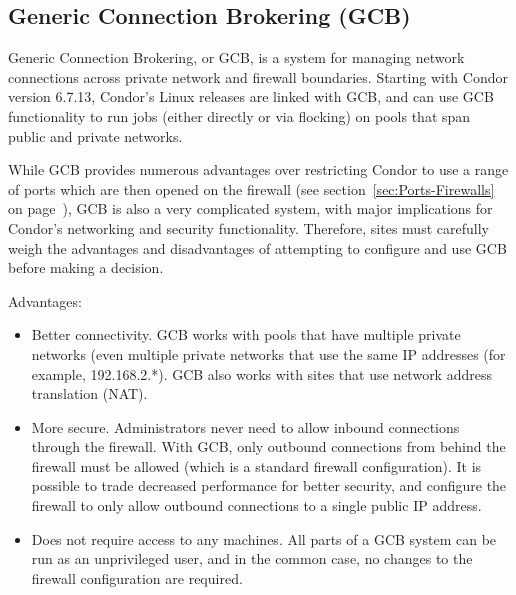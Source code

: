 \subsection{\label{sec:GCB}Generic Connection Brokering (GCB)}

Generic Connection Brokering, or GCB, is a system for managing network
connections across private network and firewall boundaries.
Starting with Condor version 6.7.13,
Condor's Linux releases are linked with GCB,
and can use GCB functionality to run jobs
(either directly or via flocking)
on pools that span public and private networks.

While GCB provides numerous advantages over restricting Condor to use
a range of ports which are then opened on the firewall (see
section~\ref{sec:Ports-Firewalls} on
page~\pageref{sec:Ports-Firewalls}),
GCB is also a very complicated system, with major
implications for Condor's networking and security functionality.
Therefore, sites must carefully weigh the 
advantages and disadvantages
of attempting
to configure and use GCB before making a decision.

Advantages:
\begin{itemize}

\item Better connectivity. GCB works with pools that have multiple
  private networks (even multiple private networks that use the same
  IP addresses (for example, 192.168.2.*).
  GCB also works with sites that use network address translation
  (NAT). 

\item More secure. Administrators never need to allow inbound
  connections through the firewall.
  With GCB, only outbound connections from behind the firewall must be
  allowed (which is a standard firewall configuration).
  It is possible to trade decreased performance for better security, and
  configure the firewall to only allow outbound connections to a
  single public IP address.

\item Does not require  access to any machines.
  All parts of a GCB system can be run as an unprivileged user, and in
  the common case, no changes to the firewall configuration are
  required.

\end{itemize}

